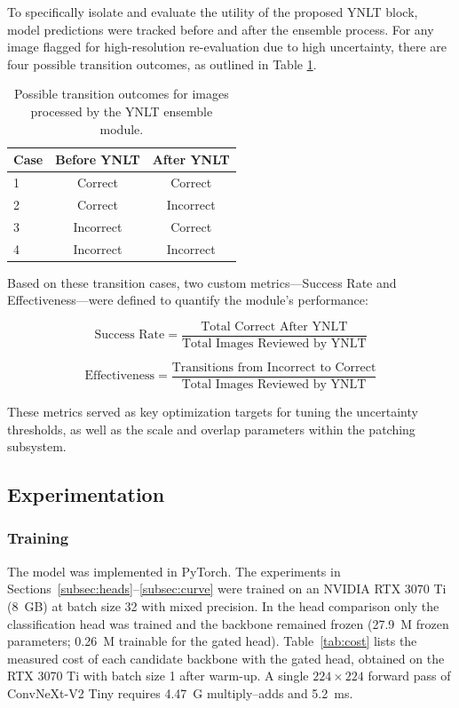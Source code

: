 \documentclass[final,3p,times,twocolumn]{elsarticle}
\begin{document}
To specifically isolate and evaluate the utility of the proposed YNLT block, model predictions were tracked before and after the ensemble process. For any image flagged for high-resolution re-evaluation due to high uncertainty, there are four possible transition outcomes, as outlined in Table \ref{tab:ynlt_outcomes}.

\begin{table}[h]
    \centering
    \begin{tabular}{lcc}
        \hline
        \textbf{Case} & \textbf{Before YNLT} & \textbf{After YNLT} \\
        \hline
        1 & Correct & Correct \\
        2 & Correct & Incorrect \\
        3 & Incorrect & Correct \\
        4 & Incorrect & Incorrect \\
        \hline
    \end{tabular}
    \caption{Possible transition outcomes for images processed by the YNLT ensemble module.}
    \label{tab:ynlt_outcomes}
\end{table}

Based on these transition cases, two custom metrics—Success Rate and Effectiveness—were defined to quantify the module's performance:

\[
\text{Success Rate} = \frac{\text{Total Correct After YNLT}}{\text{Total Images Reviewed by YNLT}}
\]

\[
\text{Effectiveness} = \frac{\text{Transitions from Incorrect to Correct}}{\text{Total Images Reviewed by YNLT}}
\]

These metrics served as key optimization targets for tuning the uncertainty thresholds, as well as the scale and overlap parameters within the patching subsystem.

\subsection{Experimentation}
\subsubsection{Training}
The model was implemented in PyTorch. The experiments in Sections~\ref{subsec:heads}--\ref{subsec:curve} were trained on an NVIDIA RTX 3070 Ti (8~GB) at batch size 32 with mixed precision. In the head comparison only the classification head was trained and the backbone remained frozen (27.9~M frozen parameters; 0.26~M trainable for the gated head). Table~\ref{tab:cost} lists the measured cost of each candidate backbone with the gated head, obtained on the RTX 3070 Ti with batch size 1 after warm-up. A single \(224\times 224\) forward pass of ConvNeXt-V2 Tiny requires 4.47~G multiply--adds and 5.2~ms.
\end{document}

